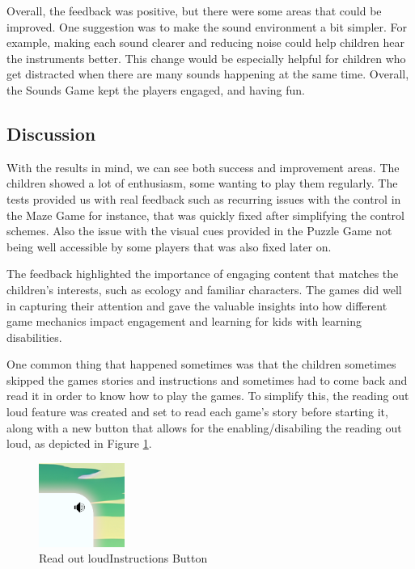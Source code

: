 Overall, the feedback was positive, but there were some areas that could be improved. One suggestion was to make the sound environment a bit simpler. For example, making each sound clearer and reducing noise could help children hear the instruments better. This change would be especially helpful for children who get distracted when there are many sounds happening at the same time. Overall, the Sounds Game kept the players engaged, and having fun.


\subsection{Discussion}

With the results in mind, we can see both success and improvement areas. The children showed a lot of enthusiasm, some wanting to play them regularly. The tests provided us with real feedback such as recurring issues with the control in the Maze Game for instance, that was quickly fixed after simplifying the control schemes. Also the issue with the visual cues provided in the Puzzle Game not being well accessible by some players that was also fixed later on.

The feedback highlighted the importance of engaging content that matches the children’s interests, such as ecology and familiar characters. The games did well in capturing their attention and gave the valuable insights into how different game mechanics impact engagement and learning for kids with learning disabilities.

One common thing that happened sometimes was that the children sometimes skipped the games stories and instructions and sometimes had to come back and read it in order to know how to play the games. To simplify this, the reading out loud feature was created and set to read each game's story before starting it, along with a new button that allows for the enabling/disabiling the reading out loud, as depicted in Figure \ref{fig:readInstructionsButton}.

\begin{figure}[!h]
    \centering
    \includegraphics[width=0.3\linewidth]{Chapters/game_changes/read-sound-icon.png}
    \caption{Read out loudInstructions Button}
    \label{fig:readInstructionsButton}
\end{figure}

